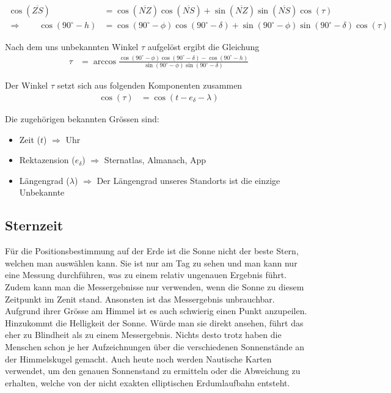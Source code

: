 \begin{refsection}
\begin{align*}
\cos(\overline{ZS}) &= \cos(\overline{NZ}) \cos(\overline{NS}) + \sin(\overline{NZ}) \sin(\overline{NS}) \cos(\tau) \\
\Rightarrow \quad \quad
\cos(90^{\circ} - h) &= \cos(90^{\circ} - \phi) \cos(90^{\circ} - \delta) + \sin(90^{\circ} - \phi)\sin(90^{\circ} - \delta) \cos(\tau)
\end{align*}

Nach dem uns unbekannten Winkel $\tau$ aufgelöst ergibt die Gleichung
\begin{align*}
\tau &= \arccos 
\frac{ \cos(90^{\circ} - \phi) \cos(90^{\circ} - \delta) - \cos(90^{\circ} - h)} {\sin(90^{\circ} - \phi)\sin(90^{\circ} - \delta)}
\end{align*}

Der Winkel $\tau$ setzt sich aus folgenden Komponenten zusammen
\begin{align*}
\cos (\tau) &= \cos (t - e_\delta - \lambda) 
\end{align*}

Die zugehörigen bekannten Grössen sind:
\begin{itemize}
\item Zeit ($t$) $\Rightarrow$ Uhr
\item Rektazension ($e_\delta$) $\Rightarrow$ Sternatlas, Almanach, App 
\item Längengrad ($\lambda$) $\Rightarrow$ Der Längengrad unseres Standorts ist die einzige Unbekannte
\end{itemize}


\subsection{Sternzeit}
Für die Positionsbestimmung auf der Erde ist die Sonne nicht der beste Stern, welchen man auswählen kann. Sie ist nur am Tag zu sehen und man kann nur eine Messung durchführen, was zu einem relativ ungenauen Ergebnis führt. Zudem kann man die Messergebnisse nur verwenden, wenn die Sonne zu diesem Zeitpunkt im Zenit stand. Ansonsten ist das Messergebnis unbrauchbar. Aufgrund ihrer Grösse am Himmel ist es auch schwierig einen Punkt anzupeilen. Hinzukommt die Helligkeit der Sonne. Würde man sie direkt ansehen, führt das eher zu Blindheit als zu einem Messergebnis.
Nichts desto trotz haben die Menschen schon je her Aufzeichnungen über die verschiedenen Sonnenstände an der Himmelskugel gemacht. Auch heute noch werden Nautische Karten verwendet, um den genauen Sonnenstand zu ermitteln oder die Abweichung zu erhalten, welche von der nicht exakten elliptischen Erdumlaufbahn entsteht.


\end{refsection}
